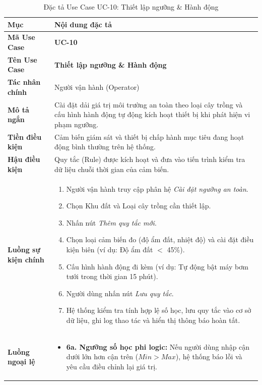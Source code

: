 \begin{table}[H]
\centering
\small
\begin{tabularx}{\textwidth}{|p{3.2cm}|X|}
\hline
\textbf{Mục} & \textbf{Nội dung đặc tả} \\ \hline
\textbf{Mã Use Case} & \textbf{UC-10} \\ \hline
\textbf{Tên Use Case} & \textbf{Thiết lập ngưỡng \& Hành động} \\ \hline
\textbf{Tác nhân chính} & Người vận hành (Operator) \\ \hline
\textbf{Mô tả ngắn} & Cài đặt dải giá trị môi trường an toàn theo loại cây trồng và cấu hình hành động tự động kích hoạt thiết bị khi phát hiện vi phạm ngưỡng. \\ \hline
\textbf{Tiền điều kiện} & Cảm biến giám sát và thiết bị chấp hành mục tiêu đang hoạt động bình thường trên hệ thống. \\ \hline
\textbf{Hậu điều kiện} & Quy tắc (Rule) được kích hoạt và đưa vào tiến trình kiểm tra dữ liệu chuỗi thời gian của cảm biến. \\ \hline
\textbf{Luồng sự kiện chính} & 
\begin{enumerate}[leftmargin=*, nosep]
    \item Người vận hành truy cập phân hệ \textit{Cài đặt ngưỡng an toàn}.
    \item Chọn Khu đất và Loại cây trồng cần thiết lập.
    \item Nhấn nút \textit{Thêm quy tắc mới}.
    \item Chọn loại cảm biến đo (độ ẩm đất, nhiệt độ) và cài đặt điều kiện biên (ví dụ: Độ ẩm đất $<$ 45\%).
    \item Cấu hình hành động đi kèm (ví dụ: Tự động bật máy bơm tưới trong thời gian 15 phút).
    \item Người dùng nhấn nút \textit{Lưu quy tắc}.
    \item Hệ thống kiểm tra tính hợp lệ số học, lưu quy tắc vào cơ sở dữ liệu, ghi log thao tác và hiển thị thông báo hoàn tất.
\end{enumerate} \\ \hline
\textbf{Luồng ngoại lệ} & 
\begin{itemize}[leftmargin=*, nosep]
    \item \textbf{6a. Ngưỡng số học phi logic:} Nếu người dùng nhập cận dưới lớn hơn cận trên ($Min > Max$), hệ thống báo lỗi và yêu cầu điều chỉnh lại giá trị.
\end{itemize} \\ \hline
\end{tabularx}
\caption{Đặc tả Use Case UC-10: Thiết lập ngưỡng \& Hành động}
\label{tab:uc_10}
\end{table}

